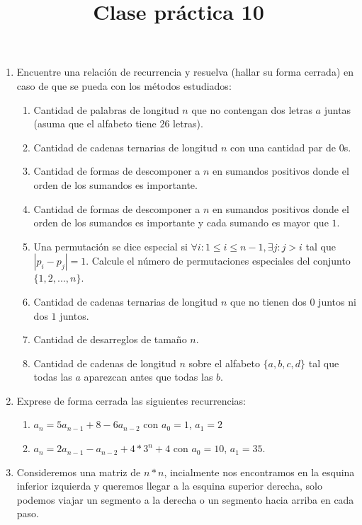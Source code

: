 \documentclass{article}
\title{Clase pr\'actica 10}
\begin{document}
\maketitle
\date{}
\begin{enumerate}
	\item Encuentre una relaci\'on de recurrencia y resuelva (hallar su forma cerrada) en caso de que se pueda con los m\'etodos estudiados:
        \begin{enumerate}
            \item Cantidad de palabras de longitud $n$ que no contengan dos letras $a$ juntas (asuma que el alfabeto tiene $26$ letras).
            \item Cantidad de cadenas ternarias de longitud $n$ con una cantidad par de $0$s. 
            \item Cantidad de formas de descomponer a $n$ en sumandos positivos donde el orden de los sumandos es importante.
            \item Cantidad de formas de descomponer a $n$ en sumandos positivos donde el orden de los sumandos es importante y cada sumando es mayor que $1$.
            \item Una permutaci\'on se dice especial si $\forall i: 1 \leq i \leq n-1, \exists j: j > i$ tal que $|p_i - p_j| = 1$. Calcule el n\'umero de permutaciones especiales del conjunto $\{1,2,...,n\}$.
            \item Cantidad de cadenas ternarias de longitud $n$ que no tienen dos $0$ juntos ni dos $1$ juntos.
            \item Cantidad de desarreglos de tamaño $n$.
            \item Cantidad de cadenas de longitud $n$ sobre el alfabeto $\{a,b,c,d\}$ tal que todas las $a$ aparezcan antes que todas las $b$.
        \end{enumerate}
    \item Exprese de forma cerrada las siguientes recurrencias:
        \begin{enumerate}
            \item $a_n=5a_{n-1}+8-6a_{n-2}$ con $a_0 = 1$, $a_1=2$
            \item $a_n = 2a_{n-1} - a_{n-2} + 4*3^n + 4$ con $a_0=10$, $a_1 = 35$. 
        \end{enumerate}
    \item Consideremos una matriz de $n*n$, incialmente nos encontramos en la esquina inferior izquierda y queremos llegar a la esquina superior derecha, solo podemos viajar un segmento a la derecha o un segmento hacia arriba en cada paso.

\end{enumerate}
\end{document}
